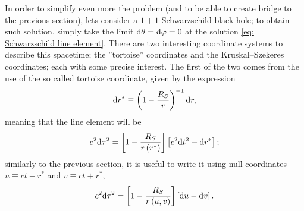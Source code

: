 In order to simplify even more the problem (and to be able to create bridge to the previous section), lets consider a $1+1$ Schwarzschild black hole; to obtain such solution, simply take the limit $\text{d}\theta=\text{d}\varphi=0$ at the solution \ref{eq: Schwarzschild line element}. There are two interesting coordinate systems to describe this spacetime; the ''tortoise'' coordinates and the Kruskal–Szekeres coordinates; each with some precise interest. The first of the two comes from the use of the so called tortoise coordinate, given by the expression
\begin{equation}\label{eq: Tortoise coordinate diff}
	\text{d} r^*\equiv \left(1-\frac{R_S}{r}\right)^{-1}\text{d} r,
\end{equation}
meaning that the line element will be
\begin{equation}
	c^2\text{d}\tau^2=\left[1-\frac{R_S}{r\left(r^*\right)}\right]\left[c^2\text{d} t^2-\text{d} r^*\right];
\end{equation}
similarly to the previous section, it is useful to write it using null coordinates $u\equiv ct-r^*$ and $v\equiv ct+r^*$,
\begin{equation}
	c^2\text{d}\tau^2=\left[1-\frac{R_S}{r\left(u,v\right)}\right]\left[\text{d} u-\text{d} v\right].
\end{equation}

